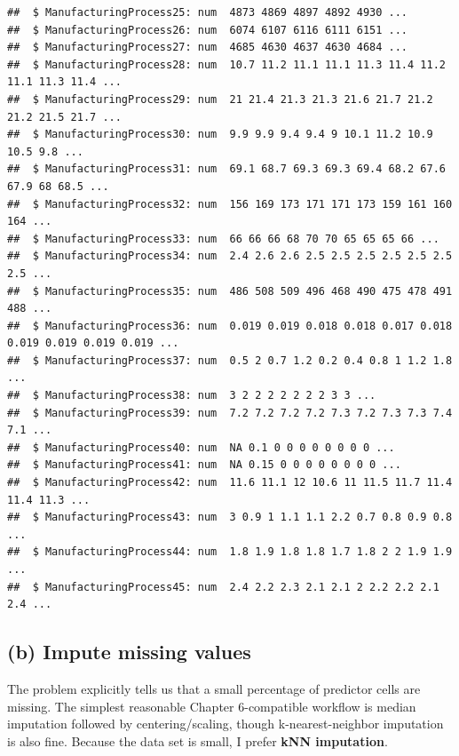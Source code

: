 \documentclass[
  11pt,
]{article}
\newenvironment{Shaded}{\begin{snugshade}}{\end{snugshade}}
\newcommand{\FunctionTok}[1]{\textcolor[rgb]{0.13,0.29,0.53}{\textbf{#1}}}
\newcommand{\NormalTok}[1]{#1}
\newcommand{\OtherTok}[1]{\textcolor[rgb]{0.56,0.35,0.01}{#1}}
\newcommand{\SpecialCharTok}[1]{\textcolor[rgb]{0.81,0.36,0.00}{\textbf{#1}}}
\begin{document}
\begin{verbatim}
##  $ ManufacturingProcess25: num  4873 4869 4897 4892 4930 ...
##  $ ManufacturingProcess26: num  6074 6107 6116 6111 6151 ...
##  $ ManufacturingProcess27: num  4685 4630 4637 4630 4684 ...
##  $ ManufacturingProcess28: num  10.7 11.2 11.1 11.1 11.3 11.4 11.2 11.1 11.3 11.4 ...
##  $ ManufacturingProcess29: num  21 21.4 21.3 21.3 21.6 21.7 21.2 21.2 21.5 21.7 ...
##  $ ManufacturingProcess30: num  9.9 9.9 9.4 9.4 9 10.1 11.2 10.9 10.5 9.8 ...
##  $ ManufacturingProcess31: num  69.1 68.7 69.3 69.3 69.4 68.2 67.6 67.9 68 68.5 ...
##  $ ManufacturingProcess32: num  156 169 173 171 171 173 159 161 160 164 ...
##  $ ManufacturingProcess33: num  66 66 66 68 70 70 65 65 65 66 ...
##  $ ManufacturingProcess34: num  2.4 2.6 2.6 2.5 2.5 2.5 2.5 2.5 2.5 2.5 ...
##  $ ManufacturingProcess35: num  486 508 509 496 468 490 475 478 491 488 ...
##  $ ManufacturingProcess36: num  0.019 0.019 0.018 0.018 0.017 0.018 0.019 0.019 0.019 0.019 ...
##  $ ManufacturingProcess37: num  0.5 2 0.7 1.2 0.2 0.4 0.8 1 1.2 1.8 ...
##  $ ManufacturingProcess38: num  3 2 2 2 2 2 2 2 3 3 ...
##  $ ManufacturingProcess39: num  7.2 7.2 7.2 7.2 7.3 7.2 7.3 7.3 7.4 7.1 ...
##  $ ManufacturingProcess40: num  NA 0.1 0 0 0 0 0 0 0 0 ...
##  $ ManufacturingProcess41: num  NA 0.15 0 0 0 0 0 0 0 0 ...
##  $ ManufacturingProcess42: num  11.6 11.1 12 10.6 11 11.5 11.7 11.4 11.4 11.3 ...
##  $ ManufacturingProcess43: num  3 0.9 1 1.1 1.1 2.2 0.7 0.8 0.9 0.8 ...
##  $ ManufacturingProcess44: num  1.8 1.9 1.8 1.8 1.7 1.8 2 2 1.9 1.9 ...
##  $ ManufacturingProcess45: num  2.4 2.2 2.3 2.1 2.1 2 2.2 2.2 2.1 2.4 ...
\end{verbatim}

\begin{Shaded}
\end{Shaded}

\subsection{(b) Impute missing values}\label{b-impute-missing-values}

The problem explicitly tells us that a small percentage of predictor
cells are missing. The simplest reasonable Chapter 6-compatible workflow
is median imputation followed by centering/scaling, though
k-nearest-neighbor imputation is also fine. Because the data set is
small, I prefer \textbf{kNN imputation}.
\end{document}
